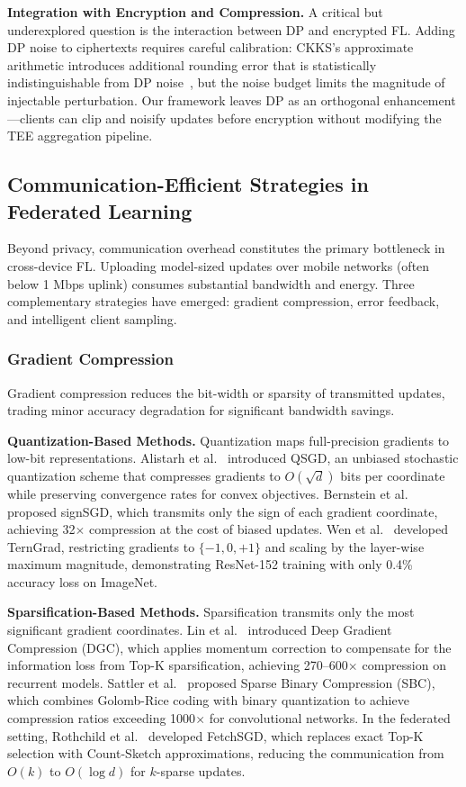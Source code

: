 \textbf{Integration with Encryption and Compression.} A critical but underexplored question is the interaction between DP and encrypted FL. Adding DP noise to ciphertexts requires careful calibration: CKKS's approximate arithmetic introduces additional rounding error that is statistically indistinguishable from DP noise~\cite{cheon2017homomorphic}, but the noise budget limits the magnitude of injectable perturbation. Our framework leaves DP as an orthogonal enhancement---clients can clip and noisify updates before encryption without modifying the TEE aggregation pipeline.

\subsection{Communication-Efficient Strategies in Federated Learning}
\label{subsec:communication-efficient}

Beyond privacy, communication overhead constitutes the primary bottleneck in cross-device FL. Uploading model-sized updates over mobile networks (often below 1 Mbps uplink) consumes substantial bandwidth and energy. Three complementary strategies have emerged: gradient compression, error feedback, and intelligent client sampling.

\subsubsection{Gradient Compression}
\label{subsubsec:compression}

Gradient compression reduces the bit-width or sparsity of transmitted updates, trading minor accuracy degradation for significant bandwidth savings.

\textbf{Quantization-Based Methods.} Quantization maps full-precision gradients to low-bit representations. Alistarh et al.~\cite{alistarh2017qsgd} introduced QSGD, an unbiased stochastic quantization scheme that compresses gradients to $O(\sqrt{d})$ bits per coordinate while preserving convergence rates for convex objectives. Bernstein et al.~\cite{bernstein2018signsgd} proposed signSGD, which transmits only the sign of each gradient coordinate, achieving 32$\times$ compression at the cost of biased updates. Wen et al.~\cite{wen2017terngrad} developed TernGrad, restricting gradients to $\{-1, 0, +1\}$ and scaling by the layer-wise maximum magnitude, demonstrating ResNet-152 training with only 0.4\% accuracy loss on ImageNet.

\textbf{Sparsification-Based Methods.} Sparsification transmits only the most significant gradient coordinates. Lin et al.~\cite{lin2018deep} introduced Deep Gradient Compression (DGC), which applies momentum correction to compensate for the information loss from Top-K sparsification, achieving 270--600$\times$ compression on recurrent models. Sattler et al.~\cite{sattler2019sparse} proposed Sparse Binary Compression (SBC), which combines Golomb-Rice coding with binary quantization to achieve compression ratios exceeding 1000$\times$ for convolutional networks. In the federated setting, Rothchild et al.~\cite{rothchild2020fetchsgd} developed FetchSGD, which replaces exact Top-K selection with Count-Sketch approximations, reducing the communication from $O(k)$ to $O(\log d)$ for $k$-sparse updates.

